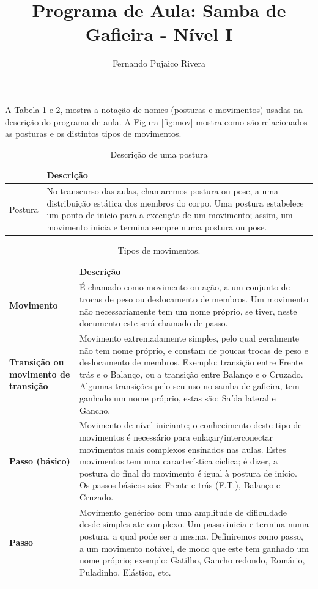 \documentclass[12pt, a4paper]{article}
\title{Programa de Aula: Samba de Gafieira - Nível I}
\author{Fernando Pujaico Rivera}
\date{}
\begin{document}
{\let\newpage\relax\maketitle}
A Tabela \ref{tab:typospos} e \ref {tab:typosmov}, mostra a notação de nomes  (posturas e movimentos) usadas 
na descrição do programa de aula.
A Figura \ref{fig:mov} mostra como são relacionados as posturas e os distintos tipos de movimentos.


\begin{table}[h]
\centering
\begin{tabular}{|p{3cm}|p{13cm}|}
\hline
~ & Descrição \\  \hline
Postura & No transcurso das aulas, chamaremos postura ou pose, a uma distribuição estática
dos membros do corpo. Uma postura estabelece um ponto de inicio para a execução de um
movimento; assim, um movimento inicia e termina sempre numa postura ou pose.\\ \hline

\end{tabular}
\caption{Descrição de uma postura}
\label{tab:typospos}
\end{table}


\begin{longtable}{|p{2.5cm}|p{13.5cm}|}
\hline
~ & Descrição \\  \hline
\textbf{Movimento} & É chamado como movimento ou ação, a um conjunto de trocas de peso ou deslocamento de membros.
Um movimento não necessariamente tem um nome próprio, se tiver, neste documento este será
chamado de passo.\\ \hline
\textbf{Transição ou movimento de transição} &  Movimento extremadamente simples, pelo qual geralmente não tem nome próprio,
e constam de poucas trocas de peso e deslocamento de membros. Exemplo: transição entre Frente trás e o Balanço, 
ou a transição entre Balanço e o Cruzado. Algumas transições
pelo seu uso no samba de gafieira, tem ganhado um nome próprio, estas são: Saída lateral e Gancho.\\ \hline
\textbf{Passo (básico)} & Movimento de nível iniciante; o conhecimento deste tipo de
movimentos é necessário para enlaçar/interconectar movimentos mais complexos ensinados nas aulas. Estes
movimentos tem uma característica cíclica; é dizer, a postura do final do movimento 
é igual à postura de início. Os passos básicos são: Frente e trás (F.T.), Balanço e Cruzado.\\ \hline
\textbf{Passo} &  Movimento genérico com uma amplitude de dificuldade desde simples ate complexo.
Um passo inicia e termina numa postura, a qual pode ser a mesma. Definiremos como passo, a um movimento
notável, de modo que este tem ganhado um nome próprio; exemplo: Gatilho, Gancho redondo, Romário, Puladinho, Elástico, etc. \\ \hline
\caption{Tipos de movimentos.}
\label{tab:typosmov}
\end{longtable}
\end{document}
